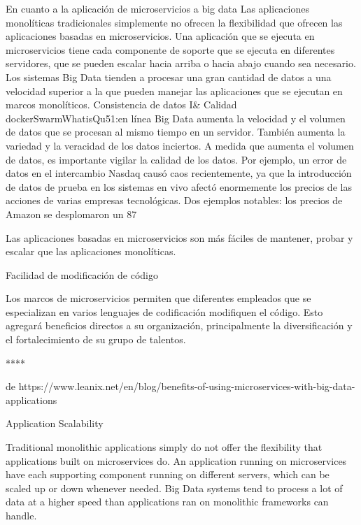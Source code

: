 En cuanto a la aplicación de microservicios a big data
Las aplicaciones monolíticas tradicionales simplemente no ofrecen la flexibilidad que ofrecen las aplicaciones basadas en microservicios. Una aplicación que se ejecuta en microservicios tiene cada componente de soporte que se ejecuta en diferentes servidores, que se pueden escalar hacia arriba o hacia abajo cuando sea necesario. Los sistemas Big Data tienden a procesar una gran cantidad de datos a una velocidad superior a la que pueden manejar las aplicaciones que se ejecutan en marcos monolíticos.
Consistencia de datos I\& Calidad
dockerSwarmWhatisQu51:en línea
Big Data aumenta la velocidad y el volumen de datos que se procesan al mismo tiempo en un servidor. También aumenta la variedad y la veracidad de los datos inciertos. A medida que aumenta el volumen de datos, es importante vigilar la calidad de los datos. Por ejemplo, un error de datos en el intercambio Nasdaq causó caos recientemente, ya que la introducción de datos de prueba en los sistemas en vivo afectó enormemente los precios de las acciones de varias empresas tecnológicas. Dos ejemplos notables: los precios de Amazon se desplomaron un 87 %

Las aplicaciones basadas en microservicios son más fáciles de mantener, probar y escalar que las aplicaciones monolíticas.

Facilidad de modificación de código

Los marcos de microservicios permiten que diferentes empleados que se especializan en varios lenguajes de codificación modifiquen el código. Esto agregará beneficios directos a su organización, principalmente la diversificación y el fortalecimiento de su grupo de talentos.




\cite{Mauersberger2022Apr}
****

de https://www.leanix.net/en/blog/benefits-of-using-microservices-with-big-data-applications

Application Scalability

Traditional monolithic applications simply do not offer the flexibility that applications built on microservices do. An application running on microservices have each supporting component running on different servers, which can be scaled up or down whenever needed. Big Data systems tend to process a lot of data at a higher speed than applications ran on monolithic frameworks can handle.


